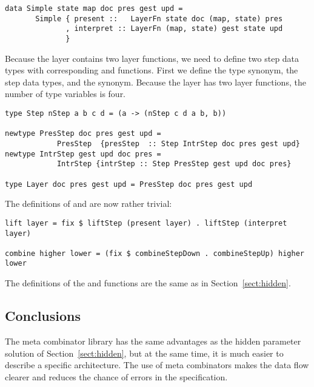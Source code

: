 \documentclass[preprint,natbib]{sigplanconf}
\begin{document}
\begin{small} %
\begin{verbatim}
data Simple state map doc pres gest upd =
       Simple { present ::   LayerFn state doc (map, state) pres
              , interpret :: LayerFn (map, state) gest state upd
              }
\end{verbatim}
\end{small}

Because the layer contains two layer functions, we need to define two step data types with corresponding  and  functions. First we define the  type synonym, the step data types, and the  synonym. Because the layer has two layer functions, the number of type variables is four.

\begin{small} %
\begin{verbatim}
type Step nStep a b c d = (a -> (nStep c d a b, b))

newtype PresStep doc pres gest upd = 
            PresStep  {presStep  :: Step IntrStep doc pres gest upd}
newtype IntrStep gest upd doc pres = 
            IntrStep {intrStep :: Step PresStep gest upd doc pres}

type Layer doc pres gest upd = PresStep doc pres gest upd
\end{verbatim}
\end{small}


The definitions of  and  are now rather trivial:

\begin{small}
\begin{verbatim}
lift layer = fix $ liftStep (present layer) . liftStep (interpret layer)

combine higher lower = (fix $ combineStepDown . combineStepUp) higher lower
\end{verbatim}
\end{small}

The definitions of the  and  functions are the same as in Section~\ref{sect:hidden}. 


\subsection{Conclusions} 

The meta combinator library has the same advantages as the hidden parameter solution of Section~\ref{sect:hidden}, but at the same time, it is much easier to describe a specific architecture. The use of meta combinators makes the data flow clearer and reduces the chance of errors in the specification.
\end{document}
